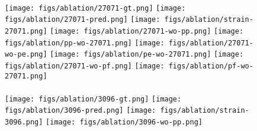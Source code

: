 \begin{figure}[htbp]
\begin{graybox}
    \\
    \texttt{[image: figs/ablation/27071-gt.png]}\hspace{0.2cm}
    \texttt{[image: figs/ablation/27071-pred.png]}\hspace{0.02cm}
    \texttt{[image: figs/ablation/strain-27071.png]}\hspace{0.2cm}
    \texttt{[image: figs/ablation/27071-wo-pp.png]}\hspace{0.02cm}
    \texttt{[image: figs/ablation/pp-wo-27071.png]}\hspace{0.2cm}
    \texttt{[image: figs/ablation/27071-wo-pe.png]}\hspace{0.02cm}
    \texttt{[image: figs/ablation/pe-wo-27071.png]}\hspace{0.2cm}
    \texttt{[image: figs/ablation/27071-wo-pf.png]}\hspace{0.02cm}
    \texttt{[image: figs/ablation/pf-wo-27071.png]}
    \\
    \footnotesize{
    \hspace{0.2cm}
    \hspace{0.02cm}
    \hspace{0.2cm}
    \hspace{0.02cm}
    \hspace{0.2cm}
    \hspace{0.02cm}
    \hspace{0.02cm}
    }
    \\
    \texttt{[image: figs/ablation/3096-gt.png]}\hspace{0.2cm}
    \texttt{[image: figs/ablation/3096-pred.png]}\hspace{0.02cm}
    \texttt{[image: figs/ablation/strain-3096.png]}\hspace{0.2cm}
    \texttt{[image: figs/ablation/3096-wo-pp.png]}\hspace{0.02cm}

\end{graybox}
\end{figure}
